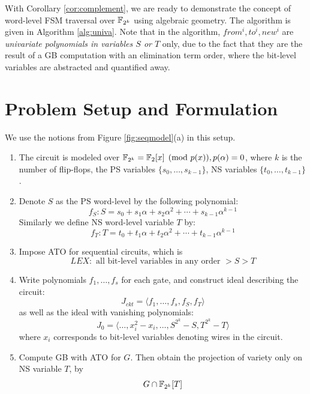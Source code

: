 With Corollary \ref{cor:complement}, we are ready to demonstrate the
concept of word-level FSM traversal over ${\mathbb{F}}_{2^k}$ using algebraic
geometry. The algorithm is given in Algorithm \ref{alg:univa}. Note that in
the algorithm, $from^i, to^i, new^i$ are {\it univariate polynomials in variables $S$
or $T$} only, due to the fact that they are the result of a GB
computation with an elimination term order, where the bit-level 
variables are abstracted and quantified away.

\section{Problem Setup and Formulation}
\begin{Problem}
We use the notions from Figure \ref{fig:seqmodel}(a) in this setup. 
\begin{enumerate}[{1)}] 
\item The circuit is modeled over ${\mathbb{F}}_{2^k} = {\mathbb{F}}_2[x]\pmod{p(x)}, p(\alpha) = 0$, where $k$ is the number of flip-flops,
	the PS variables $\{s_0,\dots,s_{k-1}\}$, NS variables $\{t_0,\dots,t_{k-1}\}$.
\item Denote $S$ as the PS word-level by the following polynomial:
$$f_S: S = s_0+s_1\alpha+s_2\alpha^2+\cdots+s_{k-1}\alpha^{k-1}$$
Similarly we define NS word-level variable $T$ by:
$$f_T: T = t_0+t_1\alpha+t_2\alpha^2+\cdots+t_{k-1}\alpha^{k-1}$$
\item Impose ATO for sequential circuits, which is 
$$LEX: \text{ all bit-level variables in any order }>S>T$$
\item Write polynomials $f_1,\dots,f_s$ for each gate, and construct ideal describing the circuit:
$$J_{ckt} = \langle f_1,\dots,f_s,f_S,f_T\rangle$$
as well as the ideal with vanishing polynomials:
$$J_0 = \langle \dots,x_i^2-x_i,\dots,S^{2^k}-S,T^{2^k}-T\rangle$$
where $x_i$ corresponds to bit-level variables denoting wires in the circuit.
\item Compute GB with ATO for $G$. Then obtain the projection of variety only on NS variable $T$, by
$$G\cap {\mathbb{F}}_{2^k}[T]$$
\end{enumerate}
\end{Problem}


